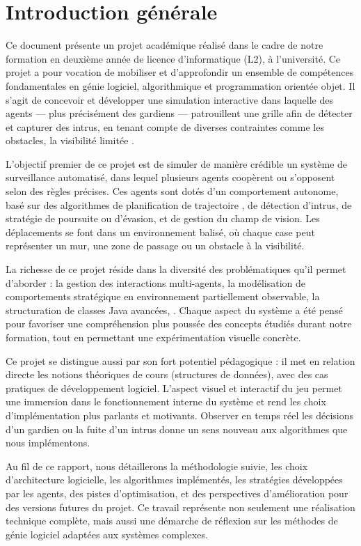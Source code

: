 \section{Introduction générale}

Ce document présente un projet académique réalisé dans le cadre de notre formation en deuxième année de licence d’informatique (L2), à l’université. Ce projet a pour vocation de mobiliser et d’approfondir un ensemble de compétences fondamentales en génie logiciel, algorithmique et programmation orientée objet. Il s’agit de concevoir et développer une simulation interactive dans laquelle des agents — plus précisément des gardiens — patrouillent une grille afin de détecter et capturer des intrus, en tenant compte de diverses contraintes comme les obstacles, la visibilité limitée .

L’objectif premier de ce projet est de simuler de manière crédible un système de surveillance automatisé, dans lequel plusieurs agents coopèrent ou s’opposent selon des règles précises. Ces agents sont dotés d’un comportement autonome, basé sur des algorithmes de planification de trajectoire , de détection d’intrus, de stratégie de poursuite ou d’évasion, et de gestion du champ de vision. Les déplacements se font dans un environnement balisé, où chaque case peut représenter un mur, une zone de passage ou un obstacle à la visibilité.

La richesse de ce projet réside dans la diversité des problématiques qu’il permet d’aborder : la gestion des interactions multi-agents, la modélisation de comportements stratégique en environnement partiellement observable, la structuration de classes Java avancées, . Chaque aspect du système a été pensé pour favoriser une compréhension plus poussée des concepts étudiés durant notre formation, tout en permettant une expérimentation visuelle concrète.

Ce projet se distingue aussi par son fort potentiel pédagogique : il met en relation directe les notions théoriques de cours (structures de données), avec des cas pratiques de développement logiciel. L’aspect visuel et interactif du jeu permet une immersion dans le fonctionnement interne du système et rend les choix d’implémentation plus parlants et motivants. Observer en temps réel les décisions d’un gardien ou la fuite d’un intrus donne un sens nouveau aux algorithmes que nous implémentons.

Au fil de ce rapport, nous détaillerons la méthodologie suivie, les choix d’architecture logicielle, les algorithmes implémentés, les stratégies développées par les agents, des pistes d’optimisation, et des perspectives d’amélioration pour des versions futures du projet. Ce travail représente non seulement une réalisation technique complète, mais aussi une démarche de réflexion sur les méthodes de génie logiciel adaptées aux systèmes complexes.

